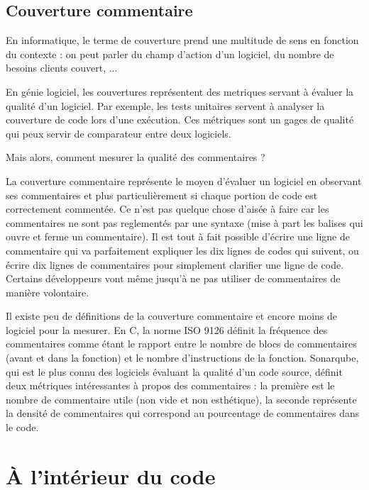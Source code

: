\documentclass[10pt,a4paper,twoside, openany]{report}
\begin{document}
\section{Couverture commentaire}

En informatique, le terme de couverture prend une multitude de sens en fonction du contexte : on peut parler du champ d'action d'un logiciel, du nombre de besoins clients couvert, ...\newline

En g\'enie logiciel, les couvertures repr\'esentent des metriques servant \`a \'evaluer la qualit\'e d'un logiciel. Par exemple, les tests unitaires servent \`a analyser la couverture de code lors d'une ex\'ecution. Ces m\'etriques sont un gages de qualit\'e qui peux servir de comparateur entre deux logiciels.\newline

Mais alors, comment mesurer la qualit\'e des commentaires ?\newline

La couverture commentaire repr\'esente le moyen d'\'evaluer un logiciel en observant ses commentaires et plus particuli\`erement si chaque portion de code est correctement comment\'ee. Ce n'est pas quelque chose d'ais\'ee \`a faire car les commentaires ne sont pas reglement\'es par une syntaxe (mise \`a part les balises qui ouvre et ferme un commentaire). Il est tout \`a fait possible d'\'ecrire une ligne de commentaire qui va parfaitement expliquer les dix lignes de codes qui suivent, ou \'ecrire dix lignes de commentaires pour simplement clarifier une ligne de code. Certains d\'eveloppeurs vont m\^eme jusqu'\`a ne pas utiliser de commentaires de mani\`ere volontaire.\newline

Il existe peu de d\'efinitions de la couverture commentaire et encore moins de logiciel pour la mesurer. En C, la norme ISO 9126 d\'efinit la fr\'equence des commentaires comme \'etant le rapport entre le nombre de blocs de commentaires (avant et dans la fonction) et le nombre d'instructions de la fonction. Sonarqube, qui est le plus connu des logiciels \'evaluant la qualit\'e d'un code source, d\'efinit deux m\'etriques int\'eressantes \`a propos des commentaires : la premi\`ere est le nombre de commentaire utile (non vide et non esth\'etique), la seconde repr\'esente la densit\'e de commentaires qui correspond au pourcentage de commentaires dans le code.

\chapter{\`A l'int\'erieur du code}
\end{document}
